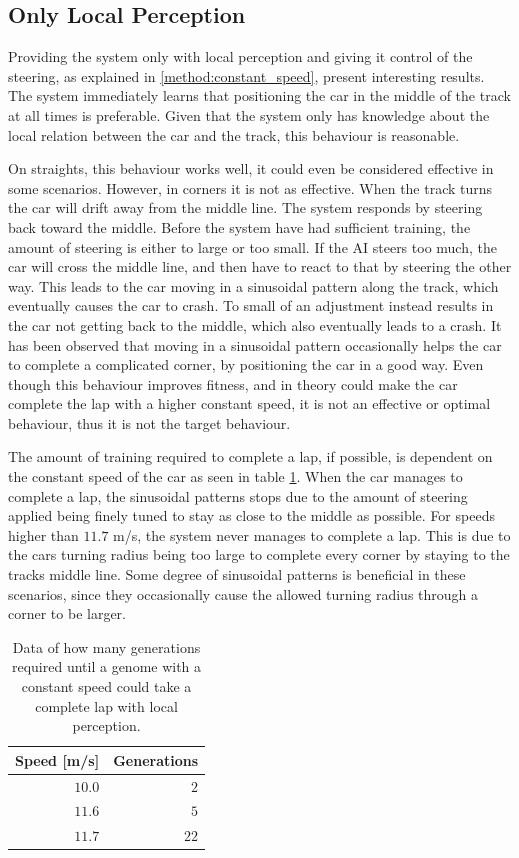 \subsection{Only Local Perception}
\label{subsec:local_perception}
Providing the system only with local perception and giving it control of the steering, as explained in \ref{method:constant_speed}, present interesting results. The system immediately learns that positioning the car in the middle of the track at all times is preferable. Given that the system only has knowledge about the local relation between the car and the track, this behaviour is reasonable.

On straights, this behaviour works well, it could even be considered effective in some scenarios. However, in corners it is not as effective. When the track turns the car will drift away from the middle line. The system responds by steering back toward the middle. Before the system have had sufficient training, the amount of steering is either to large or too small. If the AI steers too much, the car will cross the middle line, and then have to react to that by steering the other way. This leads to the car moving in a sinusoidal pattern along the track, which eventually causes the car to crash. To small of an adjustment instead results in the car not getting back to the middle, which also eventually leads to a crash. It has been observed that moving in a sinusoidal pattern occasionally helps the car to complete a complicated corner, by positioning the car in a good way. Even though this behaviour improves fitness, and in theory could make the car complete the lap with a higher constant speed, it is not an effective or optimal behaviour, thus it is not the target behaviour.

The amount of training required to complete a lap, if possible, is dependent on the constant speed of the car as seen in table \ref{tab:localdata}. When the car manages to complete a lap, the sinusoidal patterns stops due to the amount of steering applied being finely tuned to stay as close to the middle as possible. For speeds higher than $11.7$ m/s, the system never manages to complete a lap. This is due to the cars turning radius being too large to complete every corner by staying to the tracks middle line. Some degree of sinusoidal patterns is beneficial in these scenarios, since they occasionally cause the allowed turning radius through a corner to be larger.

\begin{table}[h!] 
  \centering
  \begin{tabular}{rr}
    \toprule
    Speed [m/s] & Generations\\
    \midrule
    $10.0$ & $2$ \\
    $11.6$ & $5$ \\
    $11.7$ & $22$ \\
    \bottomrule
  \end{tabular}
  \caption{Data of how many generations required until a genome with a constant speed could take a complete lap with local perception.}
  \label{tab:localdata}
\end{table}

